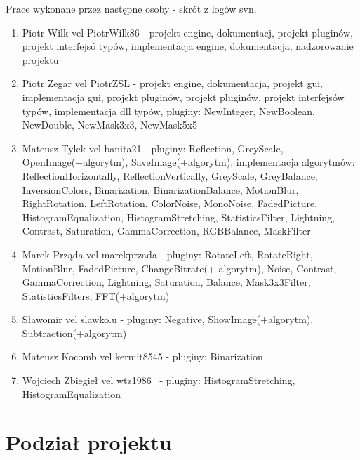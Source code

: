 Prace wykonane przez następne osoby - skrót z logów svn.
\begin{enumerate}
 \item Piotr Wilk vel PiotrWilk86 - projekt engine, dokumentacj, projekt pluginów, projekt interfejsó typów, implementacja engine, dokumentacja, nadzorowanie projektu
 \item Piotr Zegar vel PiotrZSL - projekt engine, dokumentacja, projekt gui, implementacja gui, projekt pluginów, projekt pluginów, projekt interfejsów typów, implementacja dll typów, pluginy: NewInteger, NewBoolean, NewDouble, NewMask3x3, NewMask5x5
 \item Mateusz Tylek vel banita21 - pluginy: Reflection, GreyScale, OpenImage(+algorytm), SaveImage(+algorytm), implementacja algorytmów: ReflectionHorizontally, ReflectionVertically, GreyScale, GreyBalance, InversionColors, Binarization, BinarizationBalance, MotionBlur, RightRotation, LeftRotation, ColorNoise, MonoNoise, FadedPicture, HistogramEqualization, HistogramStretching, StatisticsFilter, Lightning, Contrast, Saturation, GammaCorrection, RGBBalance, MaskFilter
 \item Marek Prząda vel marekprzada - pluginy: RotateLeft, RotateRight, MotionBlur, FadedPicture, ChangeBitrate(+ algorytm), Noise, Contrast, GammaCorrection, Lightning, Saturation, Balance, Mask3x3Filter, StatisticsFilters, FFT(+algorytm)
 \item Sławomir vel slawko.u - pluginy: Negative, ShowImage(+algorytm), Subtraction(+algorytm)
 \item Mateusz Kocomb vel kermit8545 - pluginy: Binarization
 \item Wojciech Zbiegieł vel wtz1986  - pluginy: HistogramStretching, HistogramEqualization
\end{enumerate}

\section{Podział projektu}
